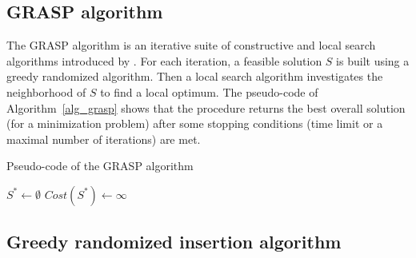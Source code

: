 \documentclass{article}
\begin{document}
{\subsection{GRASP algorithm  }

The GRASP algorithm is an iterative suite of constructive and local search algorithms introduced by \cite{feo1995greedy}. For each iteration, a feasible solution $S$ is built using a greedy randomized algorithm. Then a local search algorithm investigates the neighborhood of  $S$ to find a local optimum. The pseudo-code of Algorithm~\ref{alg_grasp} shows that the procedure returns the best overall solution (for a minimization problem) after some stopping conditions (time limit or a maximal number of iterations) are met. 

{
    {\small
        \begin{algorithm}[hpt]
            \caption{Pseudo-code of the GRASP algorithm }
            \label{alg_grasp}
            \DontPrintSemicolon
            \LinesNumbered
            \setcounter{AlgoLine}{0}
            $S^* \leftarrow \emptyset$    \hspace{2mm}       $Cost(S^*) \leftarrow \infty$



        \end{algorithm}}
}
 

\subsection{Greedy randomized insertion algorithm}

}
\end{document}
